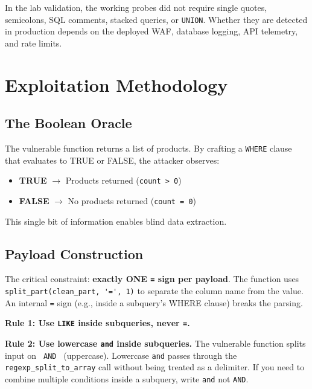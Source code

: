 \documentclass[11pt]{article}
\begin{document}
In the lab validation, the working probes did not require single quotes,
semicolons, SQL comments, stacked queries, or \lstinline|UNION|. Whether they are
detected in production depends on the deployed WAF, database logging, API
telemetry, and rate limits.

\section{Exploitation Methodology}

\subsection{The Boolean Oracle}

The vulnerable function returns a list of products. By crafting a
\lstinline|WHERE| clause that evaluates to TRUE or FALSE, the attacker observes:

\begin{itemize}[leftmargin=1.4em]
  \item \textbf{TRUE} $\rightarrow$ Products returned (\lstinline|count > 0|)
  \item \textbf{FALSE} $\rightarrow$ No products returned (\lstinline|count = 0|)
\end{itemize}

This single bit of information enables blind data extraction.

\subsection{Payload Construction}

The critical constraint: \textbf{exactly ONE \lstinline|=| sign per payload}. The
function uses \lstinline|split_part(clean_part, '=', 1)| to separate the column
name from the value. An internal \lstinline|=| sign (e.g., inside a subquery's
WHERE clause) breaks the parsing.

\textbf{Rule 1: Use \lstinline|LIKE| inside subqueries, never \lstinline|=|.}

\textbf{Rule 2: Use lowercase \lstinline|and| inside subqueries.} The vulnerable
function splits input on \lstinline| AND | (uppercase). Lowercase \lstinline|and|
passes through the \lstinline|regexp_split_to_array| call without being treated as
a delimiter. If you need to combine multiple conditions inside a subquery, write
\lstinline|and| not \lstinline|AND|.
\end{document}
